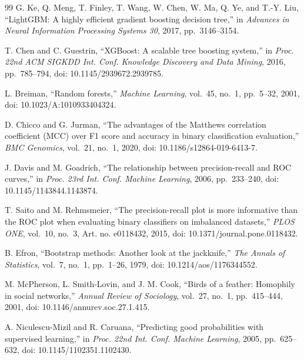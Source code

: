 \documentclass[conference]{IEEEtran}
\begin{document}
\begin{thebibliography}{99}
 G. Ke, Q. Meng, T. Finley, T. Wang, W. Chen, W. Ma, Q. Ye, and T.-Y. Liu, ``LightGBM: A highly efficient gradient boosting decision tree,'' in \emph{Advances in Neural Information Processing Systems 30}, 2017, pp.~3146--3154.

 T. Chen and C. Guestrin, ``XGBoost: A scalable tree boosting system,'' in \emph{Proc. 22nd ACM SIGKDD Int. Conf. Knowledge Discovery and Data Mining}, 2016, pp.~785--794, doi: 10.1145/2939672.2939785.

 L. Breiman, ``Random forests,'' \emph{Machine Learning}, vol.~45, no.~1, pp.~5--32, 2001, doi: 10.1023/A:1010933404324.

 D. Chicco and G. Jurman, ``The advantages of the Matthews correlation coefficient (MCC) over F1 score and accuracy in binary classification evaluation,'' \emph{BMC Genomics}, vol.~21, no.~1, 2020, doi: 10.1186/s12864-019-6413-7.

 J. Davis and M. Goadrich, ``The relationship between precision-recall and ROC curves,'' in \emph{Proc. 23rd Int. Conf. Machine Learning}, 2006, pp.~233--240, doi: 10.1145/1143844.1143874.

 T. Saito and M. Rehmsmeier, ``The precision-recall plot is more informative than the ROC plot when evaluating binary classifiers on imbalanced datasets,'' \emph{PLOS ONE}, vol.~10, no.~3, Art. no. e0118432, 2015, doi: 10.1371/journal.pone.0118432.

 B. Efron, ``Bootstrap methods: Another look at the jackknife,'' \emph{The Annals of Statistics}, vol.~7, no.~1, pp.~1--26, 1979, doi: 10.1214/aos/1176344552.

 M. McPherson, L. Smith-Lovin, and J. M. Cook, ``Birds of a feather: Homophily in social networks,'' \emph{Annual Review of Sociology}, vol.~27, no.~1, pp.~415--444, 2001, doi: 10.1146/annurev.soc.27.1.415.

 A. Niculescu-Mizil and R. Caruana, ``Predicting good probabilities with supervised learning,'' in \emph{Proc. 22nd Int. Conf. Machine Learning}, 2005, pp.~625--632, doi: 10.1145/1102351.1102430.

\end{thebibliography}
\end{document}
